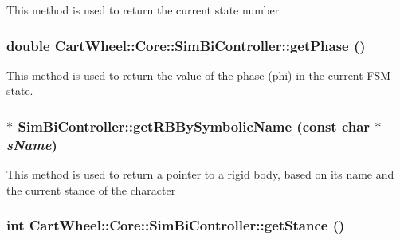 \label{classCartWheel_1_1Core_1_1SimBiController_a658737de9749bd63f391a57376a84a19}
This method is used to return the current state number \hypertarget{classCartWheel_1_1Core_1_1SimBiController_a861b41caaff2de4a485707865557c6b4}{
\subsubsection[{getPhase}]{\setlength{\rightskip}{0pt plus 5cm}double CartWheel::Core::SimBiController::getPhase ()}}
\label{classCartWheel_1_1Core_1_1SimBiController_a861b41caaff2de4a485707865557c6b4}
This method is used to return the value of the phase (phi) in the current FSM state. \hypertarget{classCartWheel_1_1Core_1_1SimBiController_a97252e3cc62ec9dbcf4c79c5a89d9678}{
\subsubsection[{getRBBySymbolicName}]{ $\ast$ SimBiController::getRBBySymbolicName (const char $\ast$ {\em sName})}}
\label{classCartWheel_1_1Core_1_1SimBiController_a97252e3cc62ec9dbcf4c79c5a89d9678}
This method is used to return a pointer to a rigid body, based on its name and the current stance of the character \hypertarget{classCartWheel_1_1Core_1_1SimBiController_a172baadc7ceae345b0b7220af9ef6a3f}{
\subsubsection[{getStance}]{\setlength{\rightskip}{0pt plus 5cm}int CartWheel::Core::SimBiController::getStance ()}}
\label{classCartWheel_1_1Core_1_1SimBiController_a172baadc7ceae345b0b7220af9ef6a3f}
